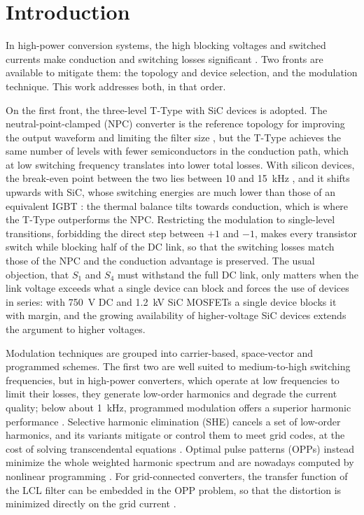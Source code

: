 \documentclass[conference]{IEEEtran}
\begin{document}
\section{Introduction}

In high-power conversion systems, the high blocking voltages and switched
currents make conduction and switching losses significant
\cite{zhang_hpm,edpuganti_survey}. Two fronts are available to mitigate them:
the topology and device selection, and the modulation technique. This work
addresses both, in that order.

On the first front, the three-level T-Type with SiC devices is adopted. The
neutral-point-clamped (NPC) converter is the reference topology for improving the
output waveform and limiting the filter size \cite{lee_npc_ttype}, but the T-Type
achieves the same number of levels with fewer semiconductors in the conduction
path, which at low switching frequency translates into lower total losses.
With silicon devices, the break-even point between the two lies between 10
and 15~kHz \cite{alemi_ttype}, and it shifts upwards with SiC, whose switching
energies are much lower than those of an equivalent IGBT
\cite{yang_sic_gan}: the thermal balance tilts
towards conduction, which is where the T-Type outperforms the NPC. Restricting
the modulation to single-level transitions, forbidding the direct step between
$+1$ and $-1$, makes every transistor switch while blocking half of the DC link,
so that the switching losses match those of the NPC and the conduction advantage
is preserved. The usual objection, that $S_1$ and $S_4$ must withstand the full
DC link, only matters when the link voltage exceeds what a single device can block
and forces the use of devices in series: with 750~V DC and 1.2~kV SiC MOSFETs a single
device blocks it with margin, and the growing availability of higher-voltage SiC
devices \cite{narasimhan_sic,nielsen_10kv} extends the argument to higher
voltages.

Modulation techniques are grouped into carrier-based, space-vector and
programmed schemes. The first two are well suited to medium-to-high switching
frequencies, but in high-power converters, which operate at low frequencies to
limit their losses, they generate low-order harmonics and degrade the current
quality; below about 1~kHz, programmed modulation offers a superior harmonic
performance \cite{zhang_hpm,tsekouras_tpel}. Selective harmonic elimination
(SHE) cancels a set of low-order harmonics, and its variants mitigate
\cite{franquelo_shm} or control \cite{zhou_shc} them to meet grid codes, at
the cost of solving transcendental equations \cite{wang_review}. Optimal pulse
patterns (OPPs) instead minimize the whole weighted harmonic spectrum and are
nowadays computed by nonlinear programming \cite{birth_genopp,geyer_bounded}.
For grid-connected converters, the transfer function of the LCL filter can be
embedded in the OPP problem, so that the distortion is minimized directly on
the grid current \cite{rahmanpour_lcl}.
\end{document}
